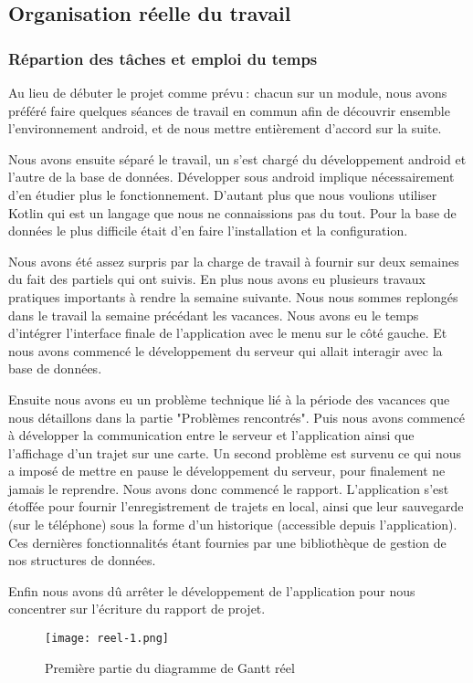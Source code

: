 \subsection{Organisation réelle du travail}
\subsubsection{Répartion des tâches et emploi du temps}
Au lieu de débuter le projet comme prévu$\ :\ $chacun sur un module, nous avons préféré faire quelques séances de travail en commun afin de découvrir ensemble l'environnement android, et de nous mettre entièrement d'accord sur la suite.
\par
Nous avons ensuite séparé le travail, un s'est chargé du développement android et l'autre de la base de données. Développer sous android implique nécessairement d'en étudier plus le fonctionnement. D'autant plus que nous voulions utiliser Kotlin qui est un langage que nous ne connaissions pas du tout.
Pour la base de données le plus difficile était d'en faire l'installation et la configuration.
\par
Nous avons été assez surpris par la charge de travail à fournir sur deux semaines du fait des partiels qui ont suivis. En plus nous avons eu plusieurs travaux pratiques importants à rendre la semaine suivante.
Nous nous sommes replongés dans le travail la semaine précédant les vacances. Nous avons eu le temps d'intégrer l'interface finale de l'application avec le menu sur le côté gauche. Et nous avons commencé le développement du serveur qui allait interagir avec la base de données.
\par
Ensuite nous avons eu un problème technique lié à la période des vacances que nous détaillons dans la partie "Problèmes rencontrés". Puis nous avons commencé à développer la communication entre le serveur et l'application ainsi que l'affichage d'un trajet sur une carte. Un second problème est survenu ce qui nous a imposé de mettre en pause le développement du serveur, pour finalement ne jamais le reprendre.
Nous avons donc commencé le rapport. L'application s'est étoffée pour fournir l'enregistrement de trajets en local, ainsi que leur sauvegarde (sur le téléphone) sous la forme d'un historique (accessible depuis l'application).
Ces dernières fonctionnalités étant fournies par une bibliothèque de gestion de nos structures de données.
\par
Enfin nous avons dû arrêter le développement de l'application pour nous concentrer sur l'écriture du rapport de projet.
\vfill
\begin{figure}[!h]
    \begin{center}
        \texttt{[image: reel-1.png]}
        \caption{Première partie du diagramme de Gantt réel}
    \end{center}
\end{figure}
\newpage
